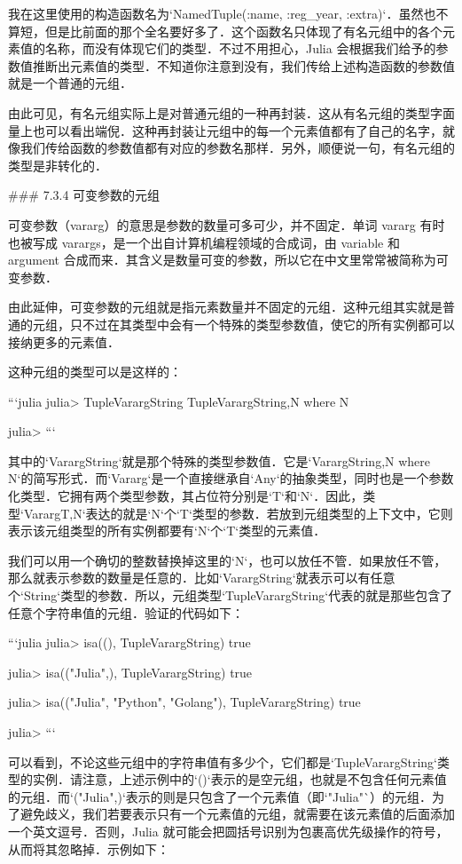 我在这里使用的构造函数名为`NamedTuple{(:name, :reg_year, :extra)}`．虽然也不算短，但是比前面的那个全名要好多了．这个函数名只体现了有名元组中的各个元素值的名称，而没有体现它们的类型．不过不用担心，Julia 会根据我们给予的参数值推断出元素值的类型．不知道你注意到没有，我们传给上述构造函数的参数值就是一个普通的元组．

由此可见，有名元组实际上是对普通元组的一种再封装．这从有名元组的类型字面量上也可以看出端倪．这种再封装让元组中的每一个元素值都有了自己的名字，就像我们传给函数的参数值都有对应的参数名那样．另外，顺便说一句，有名元组的类型是非转化的．

### 7.3.4 可变参数的元组

可变参数（vararg）的意思是参数的数量可多可少，并不固定．单词 vararg 有时也被写成 varargs，是一个出自计算机编程领域的合成词，由 variable 和 argument 合成而来．其含义是数量可变的参数，所以它在中文里常常被简称为可变参数．

由此延伸，可变参数的元组就是指元素数量并不固定的元组．这种元组其实就是普通的元组，只不过在其类型中会有一个特殊的类型参数值，使它的所有实例都可以接纳更多的元素值．

这种元组的类型可以是这样的：

```julia
julia> Tuple{Vararg{String}}
Tuple{Vararg{String,N} where N}

julia> 
```

其中的`Vararg{String}`就是那个特殊的类型参数值．它是`Vararg{String,N} where N`的简写形式．而`Vararg`是一个直接继承自`Any`的抽象类型，同时也是一个参数化类型．它拥有两个类型参数，其占位符分别是`T`和`N`．因此，类型`Vararg{T,N}`表达的就是`N`个`T`类型的参数．若放到元组类型的上下文中，它则表示该元组类型的所有实例都要有`N`个`T`类型的元素值．

我们可以用一个确切的整数替换掉这里的`N`，也可以放任不管．如果放任不管，那么就表示参数的数量是任意的．比如`Vararg{String}`就表示可以有任意个`String`类型的参数．所以，元组类型`Tuple{Vararg{String}}`代表的就是那些包含了任意个字符串值的元组．验证的代码如下：

```julia
julia> isa((), Tuple{Vararg{String}})
true

julia> isa(("Julia",), Tuple{Vararg{String}})
true

julia> isa(("Julia", "Python", "Golang"), Tuple{Vararg{String}})
true

julia> 
```

可以看到，不论这些元组中的字符串值有多少个，它们都是`Tuple{Vararg{String}}`类型的实例．请注意，上述示例中的`()`表示的是空元组，也就是不包含任何元素值的元组．而`("Julia",)`表示的则是只包含了一个元素值（即`"Julia"`）的元组．为了避免歧义，我们若要表示只有一个元素值的元组，就需要在该元素值的后面添加一个英文逗号．否则，Julia 就可能会把圆括号识别为包裹高优先级操作的符号，从而将其忽略掉．示例如下：

